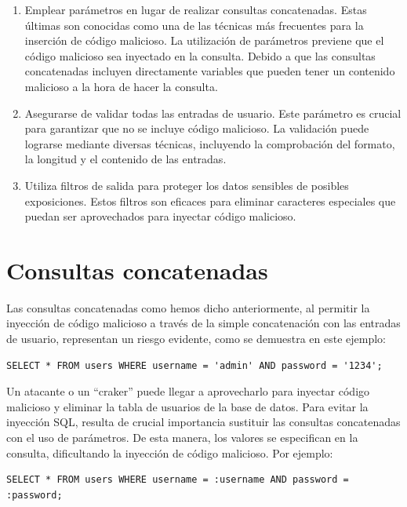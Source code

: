 \documentclass[11pt]{report}
\begin{document}
\begin{enumerate}
  \item Emplear parámetros en lugar de realizar consultas concatenadas. Estas últimas son conocidas
  como una de las técnicas más frecuentes para la inserción de código malicioso. La utilización de
  parámetros previene que el código malicioso sea inyectado en la consulta. Debido a que las consultas
  concatenadas incluyen directamente variables que pueden tener un contenido malicioso a la hora de hacer la consulta.

  \item Asegurarse de validar todas las entradas de usuario. Este parámetro es crucial para garantizar
  que no se incluye código malicioso. La validación puede lograrse mediante diversas técnicas, incluyendo
  la comprobación del formato, la longitud y el contenido de las entradas.
  
  \item Utiliza filtros de salida para proteger los datos sensibles de posibles exposiciones. Estos
  filtros son eficaces para eliminar caracteres especiales que puedan ser aprovechados para inyectar
  código malicioso.
\end{enumerate}

\section{Consultas concatenadas}
Las consultas concatenadas como hemos dicho anteriormente, al permitir la inyección de código malicioso a
través de la simple concatenación con las entradas de usuario, representan un riesgo evidente, como se 
demuestra en este ejemplo:

\begin{center}
\begin{BVerbatim}
SELECT * FROM users WHERE username = 'admin' AND password = '1234';
\end{BVerbatim}
\end{center}

Un atacante o un “craker” puede llegar a aprovecharlo para inyectar código malicioso y eliminar la tabla
de usuarios de la base de datos.
Para evitar la inyección SQL, resulta de crucial importancia sustituir las consultas concatenadas con el
uso de parámetros. De esta manera, los valores se especifican en la consulta, dificultando la inyección
de código malicioso. Por ejemplo:

\begin{center}
\begin{BVerbatim}
SELECT * FROM users WHERE username = :username AND password = :password;
\end{BVerbatim}
\end{center}
\end{document}
